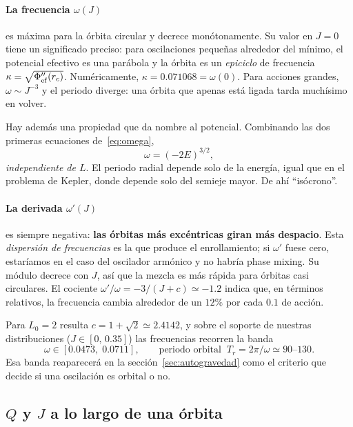 \documentclass[11pt,a4paper]{article}
\newcommand{\Jr}{J}
\newcommand{\Qr}{Q}
\theoremstyle{definition}
\begin{document}
\paragraph{La frecuencia $\omega(\Jr)$} es máxima para la órbita circular y decrece
monótonamente. Su valor en $\Jr=0$ tiene un significado preciso: para oscilaciones
pequeñas alrededor del mínimo, el potencial efectivo es una parábola y la órbita es
un \emph{epiciclo} de frecuencia $\kappa=\sqrt{\Phi_{\rm ef}''(r_c)}$. Numéricamente,
$\kappa=0.071068=\omega(0)$. Para acciones grandes, $\omega\sim\Jr^{-3}$ y el periodo
diverge: una órbita que apenas está ligada tarda muchísimo en volver.

Hay además una propiedad que da nombre al potencial. Combinando las dos primeras
ecuaciones de~\eqref{eq:omega},
\begin{equation}
  \omega = (-2E)^{3/2},
\end{equation}
\emph{independiente de $L$}. El periodo radial depende solo de la energía, igual
que en el problema de Kepler, donde depende solo del semieje mayor. De ahí
``isócrono''.

\paragraph{La derivada $\omega'(\Jr)$} es siempre negativa: \textbf{las órbitas más
excéntricas giran más despacio}. Esta \emph{dispersión de frecuencias} es la que
produce el enrollamiento; si $\omega'$ fuese cero, estaríamos en el caso del
oscilador armónico y no habría phase mixing. Su módulo decrece con $\Jr$, así que
la mezcla es más rápida para órbitas casi circulares. El cociente
$\omega'/\omega=-3/(\Jr+c)\simeq-1.2$ indica que, en términos relativos, la
frecuencia cambia alrededor de un $12\%$ por cada $0.1$ de acción.

Para $L_0=2$ resulta $c=1+\sqrt{2}\simeq2.4142$, y sobre el soporte de nuestras
distribuciones ($\Jr\in[0,\,0.35]$) las frecuencias recorren la banda
\begin{equation}
  \omega \in [0.0473,\;0.0711],
  \qquad\text{periodo orbital}\;\; T_r=2\pi/\omega \simeq 90\text{--}130.
  \label{eq:banda}
\end{equation}
Esa banda reaparecerá en la sección~\ref{sec:autogravedad} como el criterio que
decide si una oscilación es orbital o no.

\subsection{\texorpdfstring{$\Qr$ y $\Jr$}{Q y J} a lo largo de una órbita}
\end{document}
